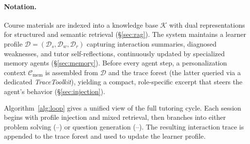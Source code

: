 \paragraph{Notation.}
Course materials are indexed into a knowledge base $\mathcal{K}$ with dual representations for structured and semantic retrieval (\S\ref{sec:rag}).
The system maintains a learner profile $\mathcal{D} = (\mathcal{D}_s, \mathcal{D}_w, \mathcal{D}_r)$ capturing interaction summaries, diagnosed weaknesses, and tutor self-reflections, continuously updated by specialized memory agents (\S\ref{sec:memory}).
Before every agent step, a personalization context $\mathcal{C}_{\text{mem}}$ is assembled from $\mathcal{D}$ and the trace forest (the latter queried via a dedicated \emph{TraceToolkit}), yielding a compact, role-specific excerpt that steers the agent's behavior (\S\ref{sec:injection}).

Algorithm~\ref{alg:loop} gives a unified view of the full tutoring cycle.
Each session begins with profile injection and mixed retrieval, then branches into either problem solving (--) or question generation (--).
The resulting interaction trace is appended to the trace forest and used to update the learner profile.

